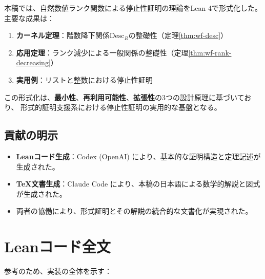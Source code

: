 \documentclass[11pt,a4paper]{ltjsarticle}
\theoremstyle{definition}
\begin{document}
本稿では、自然数値ランク関数による停止性証明の理論をLean 4で形式化した。
主要な成果は：

\begin{enumerate}
\item \textbf{カーネル定理}：階数降下関係$\mathrm{Desc}_R$の整礎性（定理\ref{thm:wf-desc}）
\item \textbf{応用定理}：ランク減少による一般関係の整礎性（定理\ref{thm:wf-rank-decreasing}）
\item \textbf{実用例}：リストと整数における停止性証明
\end{enumerate}

この形式化は、\textbf{最小性}、\textbf{再利用可能性}、\textbf{拡張性}の3つの設計原理に基づいており、
形式的証明支援系における停止性証明の実用的な基盤となる。

\subsection{貢献の明示}

\begin{itemize}
\item \textbf{Leanコード生成}：Codex (OpenAI) により、基本的な証明構造と定理記述が生成された。
\item \textbf{TeX文書生成}：Claude Code により、本稿の日本語による数学的解説と図式が生成された。
\item 両者の協働により、形式証明とその解説の統合的な文書化が実現された。
\end{itemize}

\appendix

\section{Leanコード全文}

参考のため、実装の全体を示す：
\end{document}
